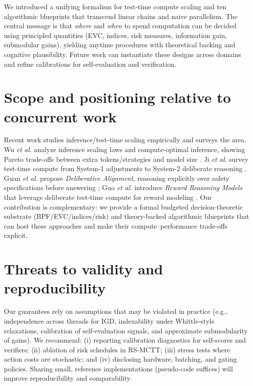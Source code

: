 \documentclass[11pt]{article}
\newcommand{\1}{\mathbb{I}}
\begin{document}
We introduced a unifying formalism for test-time compute scaling and ten algorithmic blueprints that transcend linear chains and naive parallelism. 
The central message is that \emph{where} and \emph{when} to spend computation can be decided using principled quantities (EVC, indices, risk measures, information gain, submodular gains), yielding anytime procedures with theoretical backing and cognitive plausibility.
Future work can instantiate these designs across domains and refine calibrations for self-evaluation and verification.

\section{Scope and positioning relative to concurrent work}

Recent work studies inference/test-time scaling empirically and surveys the area. Wu \emph{et al.} analyze inference
scaling laws and compute-optimal inference, showing Pareto trade-offs between extra tokens/strategies and model size \cite{wu2024inference}.
Ji \emph{et al.} survey test-time compute from System-1 adjustments to System-2 deliberate reasoning \cite{ji2025survey}.
Guan \emph{et al.} propose \emph{Deliberative Alignment}, reasoning explicitly over safety specifications before answering \cite{guan2024delibalign};
Guo \emph{et al.} introduce \emph{Reward Reasoning Models} that leverage deliberate test-time compute for reward modeling \cite{guo2025rrm}.
Our contribution is complementary: we provide a formal budgeted decision-theoretic substrate (BPF/EVC/indices/risk) and
theory-backed algorithmic blueprints that can host these approaches and make their compute--performance trade-offs explicit.

\section{Threats to validity and reproducibility}

Our guarantees rely on assumptions that may be violated in practice (e.g., independence across threads for IGD,
indexability under Whittle-style relaxations, calibration of self-evaluation signals, and approximate submodularity of gains).
We recommend: (i) reporting calibration diagnostics for self-scores and verifiers; (ii) ablation of risk schedules in RS-MCTT;
(iii) stress tests where action costs are stochastic; and (iv) disclosing hardware, batching, and gating policies. Sharing small,
reference implementations (pseudo-code suffices) will improve reproducibility and comparability.
\end{document}
